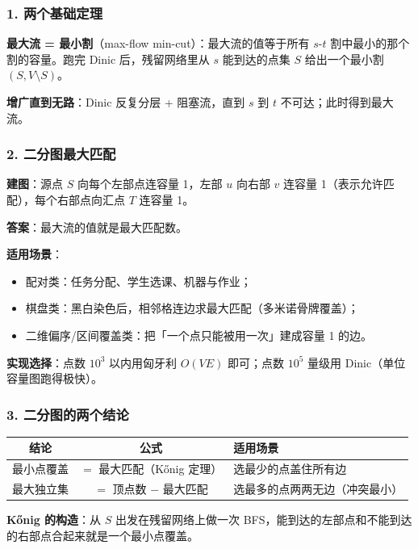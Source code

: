 \subsubsection*{1. 两个基础定理}

\textbf{最大流 = 最小割}（max-flow min-cut）：最大流的值等于所有 $s$-$t$ 割中最小的那个割的容量。跑完 Dinic 后，残留网络里从 $s$ 能到达的点集 $S$ 给出一个最小割 $(S, V\setminus S)$。

\textbf{增广直到无路}：Dinic 反复分层 + 阻塞流，直到 $s$ 到 $t$ 不可达；此时得到最大流。

\subsubsection*{2. 二分图最大匹配}

\textbf{建图}：源点 $S$ 向每个左部点连容量 1，左部 $u$ 向右部 $v$ 连容量 1（表示允许匹配），每个右部点向汇点 $T$ 连容量 1。

\textbf{答案}：最大流的值就是最大匹配数。

\textbf{适用场景}：
\begin{itemize}
    \item 配对类：任务分配、学生选课、机器与作业；
    \item 棋盘类：黑白染色后，相邻格连边求最大匹配（多米诺骨牌覆盖）；
    \item 二维偏序/区间覆盖类：把「一个点只能被用一次」建成容量 1 的边。
\end{itemize}

\textbf{实现选择}：点数 $10^3$ 以内用匈牙利 $O(VE)$ 即可；点数 $10^5$ 量级用 Dinic（单位容量图跑得极快）。

\subsubsection*{3. 二分图的两个结论}

\begin{center}
\begin{tabular}{|c|c|p{6.6cm}|}
\hline
\textbf{结论} & \textbf{公式} & \textbf{适用场景} \\
\hline
最小点覆盖 & $=$ 最大匹配（Kőnig 定理）& 选最少的点盖住所有边 \\
\hline
最大独立集 & $=$ 顶点数 $-$ 最大匹配 & 选最多的点两两无边（冲突最小）\\
\hline
\end{tabular}
\end{center}

\textbf{Kőnig 的构造}：从 $S$ 出发在残留网络上做一次 BFS，能到达的左部点和不能到达的右部点合起来就是一个最小点覆盖。

